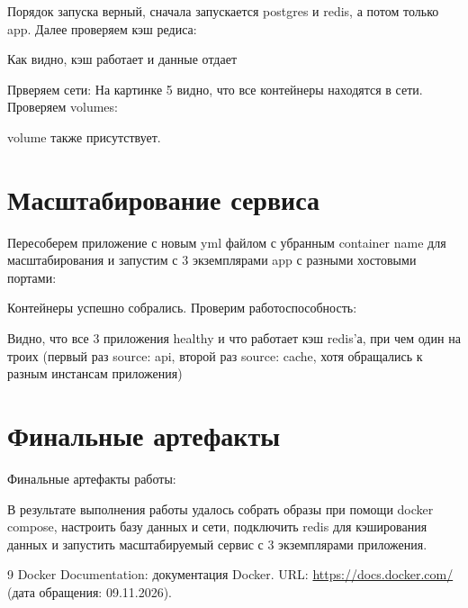 
Порядок запуска верный, сначала запускается postgres и redis, а потом только app. Далее проверяем кэш редиса:

Как видно, кэш работает и данные отдает

Прверяем сети:
На картинке 5 видно, что все контейнеры находятся в сети.
Проверяем volumes:

volume также присутствует.

\chapter{Масштабирование сервиса}

Пересоберем приложение с новым yml файлом с убранным container name для масштабирования и запустим с 3 экземплярами app с разными хостовыми портами:

Контейнеры успешно собрались. Проверим работоспособность:

Видно, что все 3 приложения healthy и что работает кэш redis'а, при чем один на троих (первый раз source: api, второй раз source: cache, хотя обращались к разным инстансам приложения)



\chapter{Финальные артефакты}
Финальные артефакты работы:







В результате выполнения работы удалось собрать образы при помощи docker compose, настроить базу данных и сети, подключить redis для кэширования данных и запустить масштабируемый сервис с 3 экземплярами приложения.

\begin{thebibliography}{9}
  Docker Documentation: документация Docker.
  URL: \url{https://docs.docker.com/}
  (дата обращения: 09.11.2026).
\end{thebibliography}

